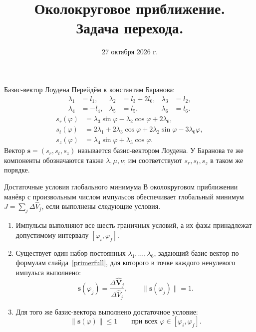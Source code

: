 \documentclass[11pt,aspectratio=169,t]{beamer}
\title{Околокруговое приближение.\\Задача перехода.}
\date{27 октября 2026 г.}
\newcommand{\eqcompact}{\fontsize{10}{12}\selectfont}
\newcommand{\derivationmathspacing}{%
  \setlength{\abovedisplayskip}{2pt}%
  \setlength{\belowdisplayskip}{3pt}%
  \setlength{\abovedisplayshortskip}{2pt}%
  \setlength{\belowdisplayshortskip}{2pt}%
  \setlength{\jot}{2pt}}
\begin{document}
\begin{frame}[plain]
\relax
\titlepage
\end{frame}

\begin{frame}{Базис-вектор Лоудена}
\relax
\label{primerfull}
\relax
\derivationmathspacing
Перейдём к константам Баранова:
{\derivationmathspacing
\[
\boxed{\begin{aligned}
 \lambda_1&=l_1,&\lambda_2&=l_3+2l_6,&\lambda_3&=l_2,\\
 \lambda_4&=-l_4,&\lambda_5&=l_5,&\lambda_6&=l_6.
\end{aligned}}
\]
}{\derivationmathspacing
\[
\boxed{\begin{aligned}
 s_r(\varphi)&=\lambda_3\sin\varphi-\lambda_2\cos\varphi+2\lambda_6,\\
 s_t(\varphi)&=2\lambda_1+2\lambda_3\cos\varphi
                         +2\lambda_2\sin\varphi-3\lambda_6\varphi,\\
 s_z(\varphi)&=\lambda_4\sin\varphi+\lambda_5\cos\varphi.
\end{aligned}}
\]
}
\medskip
\justifying
Вектор $\boldsymbol s=(s_r,s_t,s_z)$ называется базис-вектором Лоудена.
У Баранова те же компоненты обозначаются также $\lambda,\mu,\nu$;
им соответствуют $s_r,s_t,s_z$ в таком же порядке.
\end{frame}


\begin{frame}{Достаточные условия глобального минимума}
\relax
\derivationmathspacing
\justifying
В околокруговом приближении манёвр с произвольным числом импульсов
обеспечивает глобальный минимум $J=\sum_j\Delta\widehat V_j$, если выполнены следующие условия.
\begin{enumerate}
\setlength{\itemsep}{0pt}
 \item Импульсы выполняют все шесть граничных
 условий, а их фазы принадлежат
 допустимому интервалу $[\varphi_i,\varphi_f]$.
 \item Существует один набор постоянных
 $\lambda_1,\ldots,\lambda_6$, задающий базис-вектор
 по формулам слайда~\ref{primerfull}, для которого в точке
 каждого ненулевого импульса выполнено:
 {\eqcompact\derivationmathspacing
\[
\boldsymbol s(\varphi_j)
     =\frac{\Delta\widehat{\boldsymbol V}_j}{\Delta\widehat V_j},
  \qquad \|\boldsymbol s(\varphi_j)\|=1.
\]
}
 \item Для того же базис-вектора выполнено достаточное
 условие:
 {\eqcompact\derivationmathspacing
\[
\|\boldsymbol s(\varphi)\|\leq1
  \qquad\text{при всех }\varphi\in[\varphi_i,\varphi_f].
\]
}
\end{enumerate}
\end{frame}
\end{document}
